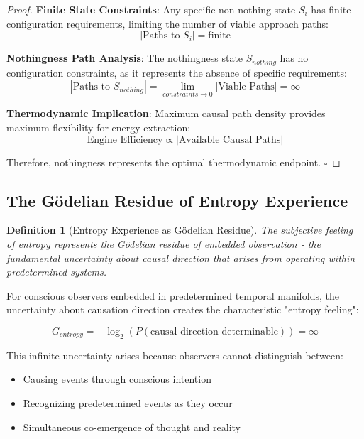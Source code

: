 \documentclass[12pt,a4paper]{article}
\newtheorem{definition}{Definition}
\begin{document}
\begin{proof}
\textbf{Finite State Constraints}: Any specific non-nothing state $S_i$ has finite configuration requirements, limiting the number of viable approach paths:
\begin{equation}
|\text{Paths to } S_i| = \text{finite}
\end{equation}

\textbf{Nothingness Path Analysis}: The nothingness state $S_{nothing}$ has no configuration constraints, as it represents the absence of specific requirements:
\begin{equation}
|\text{Paths to } S_{nothing}| = \lim_{constraints \to 0} |\text{Viable Paths}| = \infty
\end{equation}

\textbf{Thermodynamic Implication}: Maximum causal path density provides maximum flexibility for energy extraction:
\begin{equation}
\text{Engine Efficiency} \propto |\text{Available Causal Paths}|
\end{equation}

Therefore, nothingness represents the optimal thermodynamic endpoint. $\square$
\end{proof}

\subsection{The Gödelian Residue of Entropy Experience}

\begin{definition}[Entropy Experience as Gödelian Residue]
The subjective feeling of entropy represents the Gödelian residue of embedded observation - the fundamental uncertainty about causal direction that arises from operating within predetermined systems.
\end{definition}

For conscious observers embedded in predetermined temporal manifolds, the uncertainty about causation direction creates the characteristic "entropy feeling":

\begin{equation}
G_{entropy} = -\log_2(P(\text{causal direction determinable})) = \infty
\end{equation}

This infinite uncertainty arises because observers cannot distinguish between:
\begin{itemize}
\item Causing events through conscious intention
\item Recognizing predetermined events as they occur
\item Simultaneous co-emergence of thought and reality
\end{itemize}
\end{document}
